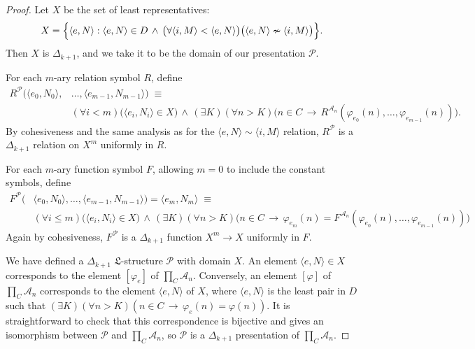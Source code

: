 \documentclass[10pt,a4paper]{amsart}
\newcommand{\imp}{\rightarrow}
\newcommand{\la}{\langle}
\newcommand{\mc}[1]{\mathcal{#1}}
\newcommand{\mf}[1]{\mathfrak{#1}}
\newcommand{\ra}{\rangle}
\begin{document}
\begin{proof}
Let $X$ be the set of least representatives:
\begin{align*}
X = \Bigl\{\la e, N \ra : \la e, N \ra \in D \,\land\, \bigl(\forall \la i, M \ra < \la e, N \ra\bigr)\bigl(\la e, N \ra \nsim \la i, M \ra\bigr)\Bigr\}.
\end{align*}
Then $X$ is $\Delta_{k+1}$, and we take it to be the domain of our presentation $\mc{P}$.

For each $m$-ary relation symbol $R$, define
\begin{align*}
R^{\mc P}\bigl(\la e_0, N_0 \ra,& \dots, \la e_{m-1}, N_{m-1} \ra\bigr) \;\equiv\\
&(\forall i < m)\bigl(\la e_i, N_i \ra \in X\bigr) \,\land\, (\exists K)(\forall n > K)\bigl(n \in C \,\imp\, R^{\mc{A}_n}(\varphi_{e_0}(n), \dots, \varphi_{e_{m-1}}(n))\bigr).
\end{align*}
By cohesiveness and the same analysis as for the $\la e, N \ra \sim \la i, M \ra$ relation, $R^{\mc P}$ is a $\Delta_{k+1}$ relation on $X^m$ uniformly in $R$.

For each $m$-ary function symbol $F$, allowing $m=0$ to include the constant symbols, define
\begin{align*}
F^{\mc P}\bigl(&\la e_0, N_0 \ra, \dots, \la e_{m-1}, N_{m-1} \ra\bigr) = \la e_m, N_m \ra \;\equiv\\
&(\forall i \leq m)\bigl(\la e_i, N_i \ra \in X\bigr) \,\land\, (\exists K)(\forall n > K)\bigl(n \in C \,\imp\, \varphi_{e_m}(n) = F^{\mc{A}_n}(\varphi_{e_0}(n), \dots, \varphi_{e_{m-1}}(n))\bigr)
\end{align*}
Again by cohesiveness, $F^{\mc P}$ is a $\Delta_{k+1}$ function $X^m \to X$ uniformly in $F$.

We have defined a $\Delta_{k+1}$ $\mf{L}$-structure $\mc{P}$ with domain $X$.  An element $\la e, N \ra \in X$ corresponds to the element $[\varphi_e]$ of $\prod_C \mc{A}_n$.  Conversely, an element $[\varphi]$ of $\prod_C \mc{A}_n$ corresponds to the element $\la e, N \ra$ of $X$, where $\la e, N \ra$ is the least pair in $D$ such that $(\exists K)(\forall n > K)(n \in C \,\imp\, \varphi_e(n) = \varphi(n))$.  It is straightforward to check that this correspondence is bijective and gives an isomorphism between $\mc{P}$ and $\prod_C \mc{A}_n$, so $\mc{P}$ is a $\Delta_{k+1}$ presentation of $\prod_C \mc{A}_n$.
\end{proof}
\end{document}
